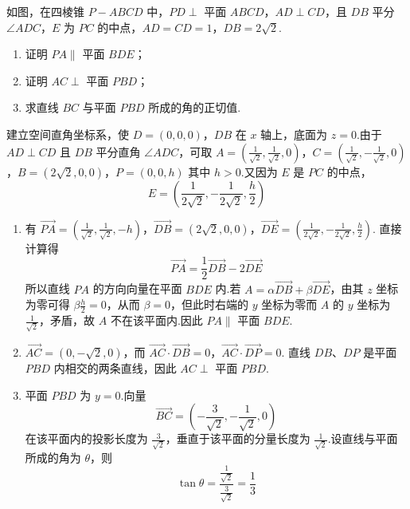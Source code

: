\begin{problem}
如图，在四棱锥 \(P-ABCD\) 中，\(PD \perp\) 平面 \(ABCD\)，\(AD \perp CD\)，且 \(DB\) 平分 \(\angle ADC\)，\(E\) 为 \(PC\) 的中点，\(AD = CD = 1\)，\(DB = 2\sqrt{2}\).
\begin{enumerate}
\item 证明 \(PA \parallel\) 平面 \(BDE\)；
\item 证明 \(AC \perp\) 平面 \(PBD\)；
\item 求直线 \(BC\) 与平面 \(PBD\) 所成的角的正切值.
\end{enumerate}
\end{problem}

\begin{solution}
建立空间直角坐标系，使 \(D=(0,0,0)\)，\(DB\) 在 \(x\) 轴上，底面为 \(z=0\).由于 \(AD\perp CD\) 且 \(DB\) 平分直角 \(\angle ADC\)，可取
\(A=\left(\frac1{\sqrt2},\frac1{\sqrt2},0\right)\)，\(C=\left(\frac1{\sqrt2},-\frac1{\sqrt2},0\right)\)，\(B=(2\sqrt2,0,0)\)，\(P=(0,0,h)\)
其中 \(h>0\).又因为 \(E\) 是 \(PC\) 的中点，
\[
E=\left(\frac1{2\sqrt2},-\frac1{2\sqrt2},\frac h2\right)
\]

\begin{enumerate}
\item 有
\(\overrightarrow{PA}=\left(\frac1{\sqrt2},\frac1{\sqrt2},-h\right)\)，\(\overrightarrow{DB}=(2\sqrt2,0,0)\)，\(\overrightarrow{DE}=\left(\frac1{2\sqrt2},-\frac1{2\sqrt2},\frac h2\right)\).
直接计算得
\[
\overrightarrow{PA}=\frac12\overrightarrow{DB}-2\overrightarrow{DE}
\]
所以直线 \(PA\) 的方向向量在平面 \(BDE\) 内.若 \(A=\alpha\overrightarrow{DB}+\beta\overrightarrow{DE}\)，由其 \(z\) 坐标为零可得 \(\beta \frac{h}{2}=0\)，从而 \(\beta=0\)，但此时右端的 \(y\) 坐标为零而 \(A\) 的 \(y\) 坐标为 \(\frac{1}{\sqrt2}\)，矛盾，故 \(A\) 不在该平面内.因此 \(PA\parallel\) 平面 \(BDE\).

\item \(\overrightarrow{AC}=(0,-\sqrt2,0)\)，而
\(\overrightarrow{AC}\cdot\overrightarrow{DB}=0\)，\(\overrightarrow{AC}\cdot\overrightarrow{DP}=0\).
直线 \(DB\)、\(DP\) 是平面 \(PBD\) 内相交的两条直线，因此 \(AC\perp\) 平面 \(PBD\).

\item 平面 \(PBD\) 为 \(y=0\).向量
\[
\overrightarrow{BC}=\left(-\frac3{\sqrt2},-\frac1{\sqrt2},0\right)
\]
在该平面内的投影长度为 \(\frac{3}{\sqrt2}\)，垂直于该平面的分量长度为 \(\frac{1}{\sqrt2}\).设直线与平面所成的角为 \(\theta\)，则
\[
\tan\theta=\frac{\frac{1}{\sqrt2}}{\frac{3}{\sqrt2}}=\frac13
\]
\end{enumerate}
\end{solution}

